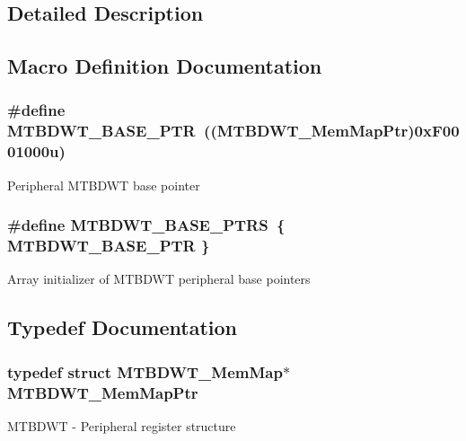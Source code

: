 \subsection{Detailed Description}


\subsection{Macro Definition Documentation}
\hypertarget{group___m_t_b_d_w_t___peripheral_ga97d048bfb5a11293a38c444b8347ff42}{}
\subsubsection[{M\+T\+B\+D\+W\+T\+\_\+\+B\+A\+S\+E\+\_\+\+P\+T\+R}]{\setlength{\rightskip}{0pt plus 5cm}\#define M\+T\+B\+D\+W\+T\+\_\+\+B\+A\+S\+E\+\_\+\+P\+T\+R~(({\bf M\+T\+B\+D\+W\+T\+\_\+\+Mem\+Map\+Ptr})0x\+F0001000u)}\label{group___m_t_b_d_w_t___peripheral_ga97d048bfb5a11293a38c444b8347ff42}
Peripheral M\+T\+B\+D\+W\+T base pointer \hypertarget{group___m_t_b_d_w_t___peripheral_ga0cbd89263cdbe0c07c59ed21112ea9ad}{}
\subsubsection[{M\+T\+B\+D\+W\+T\+\_\+\+B\+A\+S\+E\+\_\+\+P\+T\+R\+S}]{\setlength{\rightskip}{0pt plus 5cm}\#define M\+T\+B\+D\+W\+T\+\_\+\+B\+A\+S\+E\+\_\+\+P\+T\+R\+S~\{ {\bf M\+T\+B\+D\+W\+T\+\_\+\+B\+A\+S\+E\+\_\+\+P\+T\+R} \}}\label{group___m_t_b_d_w_t___peripheral_ga0cbd89263cdbe0c07c59ed21112ea9ad}
Array initializer of M\+T\+B\+D\+W\+T peripheral base pointers 

\subsection{Typedef Documentation}
\hypertarget{group___m_t_b_d_w_t___peripheral_ga8dd9bf791ed255926ccd995a6236caaf}{}
\subsubsection[{M\+T\+B\+D\+W\+T\+\_\+\+Mem\+Map\+Ptr}]{\setlength{\rightskip}{0pt plus 5cm}typedef struct {\bf M\+T\+B\+D\+W\+T\+\_\+\+Mem\+Map}$\ast$ {\bf M\+T\+B\+D\+W\+T\+\_\+\+Mem\+Map\+Ptr}}\label{group___m_t_b_d_w_t___peripheral_ga8dd9bf791ed255926ccd995a6236caaf}
M\+T\+B\+D\+W\+T -\/ Peripheral register structure 